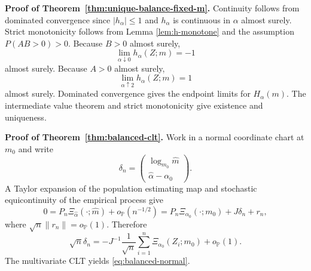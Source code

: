 \documentclass[11pt]{article}
\newcommand{\Pbb}{\mathbb P}
\newcommand{\1}{\mathbf{1}}
\begin{document}
\medskip  
\noindent \textbf{Proof of Theorem~\ref{thm:unique-balance-fixed-m}.}
Continuity follows from dominated convergence since $|h_\alpha|\le1$ and $h_\alpha$ is continuous in $\alpha$ almost surely.  Strict monotonicity follows from Lemma \ref{lem:h-monotone} and the assumption $P(AB>0)>0$.  Because $B>0$ almost surely,
\[
 \lim_{\alpha\downarrow0}h_\alpha(Z;m)=-1
\]
almost surely.  Because $A>0$ almost surely,
\[
 \lim_{\alpha\uparrow2}h_\alpha(Z;m)=1
\]
almost surely.  Dominated convergence gives the endpoint limits for $H_\alpha(m)$.  The intermediate value theorem and strict monotonicity give existence and uniqueness.

\medskip 
\noindent \textbf{Proof of Theorem~\ref{thm:balanced-clt}.}
Work in a normal coordinate chart at $m_0$ and write
\[
 \delta_n=
 \begin{pmatrix}
 \log_{m_0}\widehat m\\
 \widehat\alpha-\alpha_0
 \end{pmatrix}.
\]
A Taylor expansion of the population estimating map and stochastic equicontinuity of the empirical process give
\[
 0=P_n\Xi_{\widehat\alpha}(\cdot;\widehat m)+o_{\Pbb}(n^{-1/2})
 =P_n\Xi_{\alpha_0}(\cdot;m_0)+J\delta_n+r_n,
\]
where $\sqrt n\|r_n\|=o_{\Pbb}(1)$.  Therefore
\[
 \sqrt n\delta_n
 =-J^{-1}\frac1{\sqrt n}\sum_{i=1}^n\Xi_{\alpha_0}(Z_i;m_0)+o_{\Pbb}(1).
\]
The multivariate CLT yields \eqref{eq:balanced-normal}.











\end{document}
